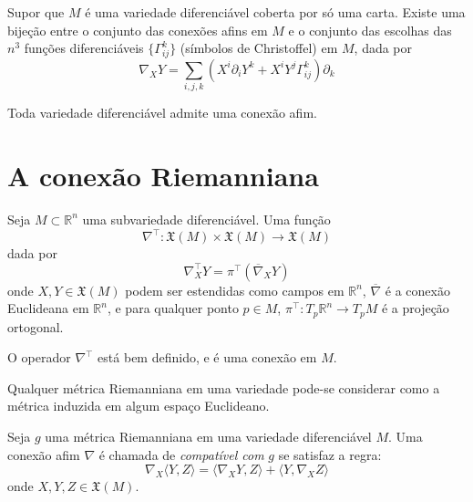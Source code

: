\begin{lema}
	Supor que $M$ é uma variedade diferenciável coberta por só uma carta. Existe uma bijeção entre o conjunto das conexões afins em $M$ e o conjunto das escolhas das $n^3$ funções diferenciáveis $\{ \Gamma^k_{ij} \}$ (símbolos de Christoffel) em $M$, dada por
	\begin{equation*}
		\nabla_X Y = \sum_{i,j,k} \left( X^i \partial_i Y^k + X^i Y^j \Gamma^k_{ij} \right) \partial_k
	\end{equation*}
\end{lema}

\begin{proposicao}
	Toda variedade diferenciável admite uma conexão afim.
\end{proposicao}


\section{A conexão Riemanniana}

\begin{definicao}
	Seja $M \subset \mathbb{R}^n$ uma subvariedade diferenciável. Uma função
	\begin{equation*}
		\nabla^\top: \mathfrak{X}(M) \times \mathfrak{X}(M) \rightarrow \mathfrak{X}(M)
	\end{equation*}
	dada por
	\begin{equation*}
		\nabla^\top_X Y = \pi^\top \left( \overline{\nabla}_X Y \right)
	\end{equation*}
	onde $X,Y \in \mathfrak{X}(M)$ podem ser estendidas como campos em $\mathbb{R}^n$, $\overline{\nabla}$ é a conexão Euclideana em $\mathbb{R}^n$, e para qualquer ponto $p \in M$, $\pi^\top: T_p \mathbb{R}^n \rightarrow T_p M$ é a projeção ortogonal.
\end{definicao}

\begin{lema}
	O operador $\nabla^\top$ está bem definido, e é uma conexão em $M$.
\end{lema}

\begin{teorema}
	Qualquer métrica Riemanniana em uma variedade pode-se considerar como a métrica induzida em algum espaço Euclideano.
\end{teorema}

\begin{definicao}
	Seja $g$ uma métrica Riemanniana em uma variedade diferenciável $M$. Uma conexão afim $\nabla$ é chamada de \emph{compatível com} $g$ se satisfaz a regra:
	\begin{equation*}
		\nabla_X \langle Y,Z \rangle = \langle \nabla_X Y, Z \rangle + \langle Y, \nabla_X Z \rangle
	\end{equation*}
	onde $X,Y,Z \in \mathfrak{X}(M)$.
\end{definicao}

